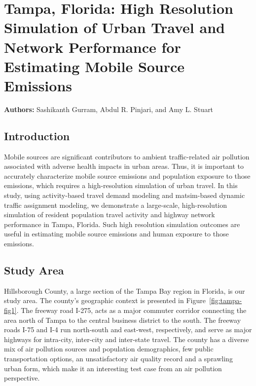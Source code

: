 \chapter{Tampa, Florida: High Resolution Simulation of Urban Travel and Network Performance for Estimating Mobile Source Emissions}
\label{ch:tampa}
\hfill \textbf{Authors:} Sashikanth Gurram, Abdul R. Pinjari, and Amy L. Stuart

\section{Introduction}
Mobile sources are significant contributors to ambient traffic-related air pollution associated with adverse health impacts in urban areas. Thus, it is important to accurately characterize mobile source emissions and population exposure to those emissions, which requires a high-resolution simulation of urban travel. In this study, using activity-based travel demand modeling and \gls{matsim}-based dynamic traffic assignment modeling, we demonstrate a large-scale, high-resolution simulation of resident population travel activity and highway network performance in Tampa, Florida. Such high resolution simulation outcomes are useful in estimating mobile source emissions and human exposure to those emissions. 

\section{Study Area}
Hillsborough County, a large section of the Tampa Bay region in Florida, is our study area. The county's geographic context is presented in Figure~\ref{fig:tampa-fig1}. The freeway road I-275, acts as a major commuter corridor connecting the area north of Tampa to the central business district to the south. The freeway roads I-75 and I-4 run north-south and east-west, respectively, and serve as major highways for intra-city, inter-city and inter-state travel. The county has a diverse mix of air pollution sources and population demographics, few public transportation options, an unsatisfactory air quality record and a sprawling urban form, which make it an interesting test case from an air pollution perspective.

